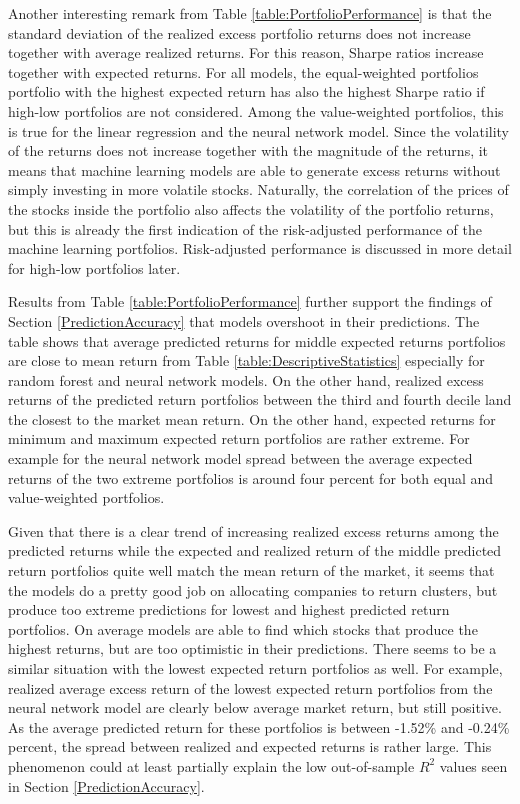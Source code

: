 \documentclass[12pt]{article}
\begin{document}
Another interesting remark from Table \ref{table:PortfolioPerformance} is that the standard deviation of the realized excess portfolio returns does not increase together with average realized returns. For this reason, Sharpe ratios increase together with expected returns. For all models, the equal-weighted portfolios portfolio with the highest expected return has also the highest Sharpe ratio if high-low portfolios are not considered. Among the value-weighted portfolios, this is true for the linear regression and the neural network model. Since the volatility of the returns does not increase together with the magnitude of the returns, it means that machine learning models are able to generate excess returns without simply investing in more volatile stocks. Naturally, the correlation of the prices of the stocks inside the portfolio also affects the volatility of the portfolio returns, but this is already the first indication of the risk-adjusted performance of the machine learning portfolios. Risk-adjusted performance is discussed in more detail for high-low portfolios later. \par

Results from Table \ref{table:PortfolioPerformance} further support the findings of Section \ref{PredictionAccuracy} that models overshoot in their predictions. The table shows that average predicted returns for middle expected returns portfolios are close to mean return from Table \ref{table:DescriptiveStatistics} especially for random forest and neural network models. On the other hand, realized excess returns of the predicted return portfolios between the third and fourth decile land the closest to the market mean return. On the other hand, expected returns for minimum and maximum expected return portfolios are rather extreme. For example for the neural network model spread between the average expected returns of the two extreme portfolios is around four percent for both equal and value-weighted portfolios. \par

Given that there is a clear trend of increasing realized excess returns among the predicted returns while the expected and realized return of the middle predicted return portfolios quite well match the mean return of the market, it seems that the models do a pretty good job on allocating companies to return clusters, but produce too extreme predictions for lowest and highest predicted return portfolios. On average models are able to find which stocks that produce the highest returns, but are too optimistic in their predictions. There seems to be a similar situation with the lowest expected return portfolios as well. For example, realized average excess return of the lowest expected return portfolios from the neural network model are clearly below average market return, but still positive. As the average predicted return for these portfolios is between -1.52\% and -0.24\% percent, the spread between realized and expected returns is rather large. This phenomenon could at least partially explain the low out-of-sample $R^2$ values seen in Section \ref{PredictionAccuracy}. \par  
\end{document}
